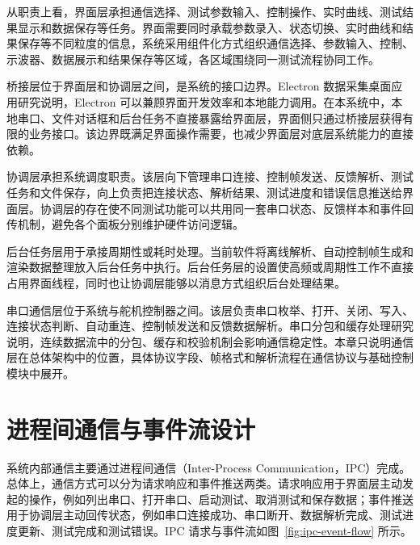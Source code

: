 从职责上看，界面层承担通信选择、测试参数输入、控制操作、实时曲线、测试结果显示和数据保存等任务。界面需要同时承载参数录入、状态切换、实时曲线和结果保存等不同粒度的信息，系统采用组件化方式组织通信选择、参数输入、控制、示波器、数据展示和结果保存等区域，各区域围绕同一测试流程协同工作。

桥接层位于界面层和协调层之间，是系统的接口边界。Electron 数据采集桌面应用研究说明，Electron 可以兼顾界面开发效率和本地能力调用\cite{gao2025electron}。在本系统中，本地串口、文件对话框和后台任务不直接暴露给界面层，界面侧只通过桥接层获得有限的业务接口。该边界既满足界面操作需要，也减少界面层对底层系统能力的直接依赖。

协调层承担系统调度职责。该层向下管理串口连接、控制帧发送、反馈解析、测试任务和文件保存，向上负责把连接状态、解析结果、测试进度和错误信息推送给界面层。协调层的存在使不同测试功能可以共用同一套串口状态、反馈样本和事件回传机制，避免各个面板分别维护硬件访问逻辑。

后台任务层用于承接周期性或耗时处理。当前软件将离线解析、自动控制帧生成和渲染数据整理放入后台任务中执行。后台任务层的设置使高频或周期性工作不直接占用界面线程，同时也让协调层能够以消息方式组织后台处理结果。

串口通信层位于系统与舵机控制器之间。该层负责串口枚举、打开、关闭、写入、连接状态判断、自动重连、控制帧发送和反馈数据解析。串口分包和缓存处理研究说明，连续数据流中的分包、缓存和校验机制会影响通信稳定性\cite{wu2025serialpacket}。本章只说明通信层在总体架构中的位置，具体协议字段、帧格式和解析流程在通信协议与基础控制模块中展开。

\section{进程间通信与事件流设计}

系统内部通信主要通过进程间通信（Inter-Process Communication，IPC）完成。总体上，通信方式可以分为请求响应和事件推送两类。请求响应用于界面层主动发起的操作，例如列出串口、打开串口、启动测试、取消测试和保存数据；事件推送用于协调层主动回传状态，例如串口连接成功、串口断开、数据解析完成、测试进度更新、测试完成和测试错误。IPC 请求与事件流如图~\ref{fig:ipc-event-flow} 所示。

